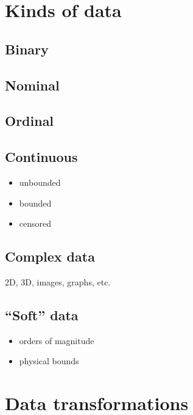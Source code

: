 \documentclass[
  a4paper,
  DIV=11,
  numbers=noendperiod,
  oneside]{scrreprt}
\begin{document}
\hypertarget{kinds-of-data}{%
\section{Kinds of data}\label{kinds-of-data}}

\hypertarget{binary}{%
\subsection{Binary}\label{binary}}

\hypertarget{nominal}{%
\subsection{Nominal}\label{nominal}}

\hypertarget{ordinal}{%
\subsection{Ordinal}\label{ordinal}}

\hypertarget{continuous}{%
\subsection{Continuous}\label{continuous}}

\begin{itemize}
\item
  unbounded
\item
  bounded
\item
  censored
\end{itemize}

\hypertarget{complex-data}{%
\subsection{Complex data}\label{complex-data}}

2D, 3D, images, graphs, etc.

\hypertarget{soft-data}{%
\subsection{``Soft'' data}\label{soft-data}}

\begin{itemize}
\item
  orders of magnitude
\item
  physical bounds
\end{itemize}

\hypertarget{data-transformations}{%
\section{Data transformations}\label{data-transformations}}
\end{document}
